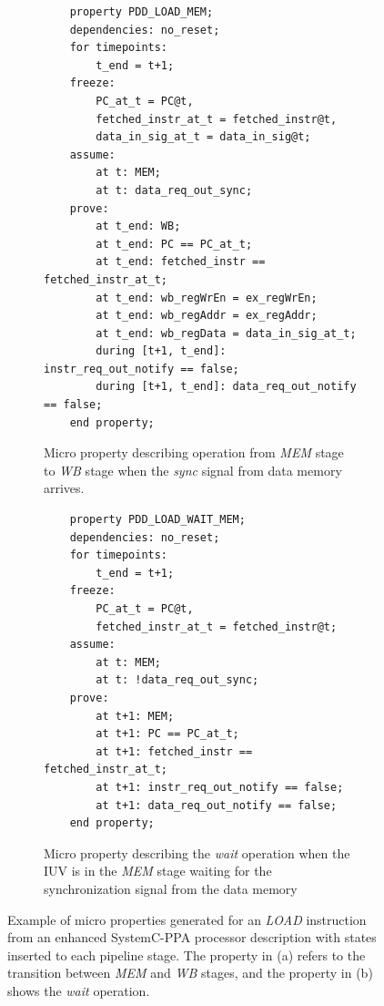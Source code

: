 \begin{figure}[htb!]
     \centering
     \begin{subfigure}[b]{\textwidth}
         \begin{lstlisting}
    property PDD_LOAD_MEM;
    dependencies: no_reset;
    for timepoints:
        t_end = t+1;
    freeze:
        PC_at_t = PC@t,
        fetched_instr_at_t = fetched_instr@t,
        data_in_sig_at_t = data_in_sig@t;
    assume:
        at t: MEM;
        at t: data_req_out_sync;
    prove:
        at t_end: WB;
        at t_end: PC == PC_at_t;
        at t_end: fetched_instr == fetched_instr_at_t;
        at t_end: wb_regWrEn = ex_regWrEn;
        at t_end: wb_regAddr = ex_regAddr;
        at t_end: wb_regData = data_in_sig_at_t;
        during [t+1, t_end]: instr_req_out_notify == false;
        during [t+1, t_end]: data_req_out_notify == false;
    end property;\end{lstlisting}
         \caption{Micro property describing operation from \textit{MEM} stage to \textit{WB} stage when the \textit{sync} signal from data memory arrives.}
         \label{subfig:load-mem-micro-ppt}
     \end{subfigure}
     \hfill
     \begin{subfigure}[b]{\textwidth}
         \begin{lstlisting}
    property PDD_LOAD_WAIT_MEM;
    dependencies: no_reset;
    for timepoints:
        t_end = t+1;
    freeze:
        PC_at_t = PC@t,
        fetched_instr_at_t = fetched_instr@t;
    assume:
        at t: MEM;
        at t: !data_req_out_sync;
    prove:
        at t+1: MEM;
        at t+1: PC == PC_at_t;
        at t+1: fetched_instr == fetched_instr_at_t;
        at t+1: instr_req_out_notify == false;
        at t+1: data_req_out_notify == false;
    end property;\end{lstlisting}
         \caption{Micro property describing the \textit{wait} operation when the IUV is in the \textit{MEM} stage waiting for the synchronization signal from the data memory}
         \label{subfig:load-wait-micro-ppt}
     \end{subfigure}
        \caption{Example of micro properties generated for an \textit{LOAD} instruction from an enhanced SystemC-PPA processor description with states inserted to each pipeline stage. The property in (a) refers to the transition between \textit{MEM} and \textit{WB} stages, and the property in (b) shows the \textit{wait} operation.}
        \label{fig:load-mem-wait-micro-ppt}
\end{figure}

